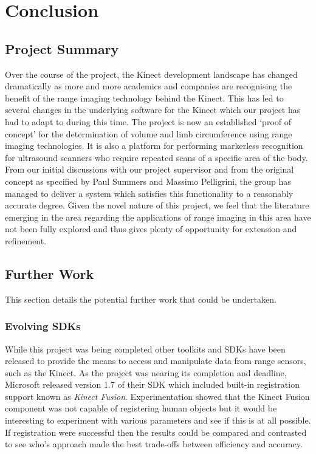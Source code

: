 \chapter{Conclusion}
\section{Project Summary}

Over the course of the project, the Kinect development landscape has changed dramatically as more and more academics and companies are recognising the benefit of the range imaging technology behind the Kinect. This has led to several changes in the underlying software for the Kinect which our project has had to adapt to during this time. The project is now an established `proof of concept' for the determination of volume and limb circumference using range imaging technologies. It is also a platform for performing markerless recognition for ultrasound scanners who require repeated scans of a specific area of the body. From our initial discussions with our project supervisor and from the original concept as specified by Paul Summers and Massimo Pelligrini, the group has managed to deliver a system which satisfies this functionality to a reasonably accurate degree. Given the novel nature of this project, we feel that the literature emerging in the area regarding the applications of range imaging in this area have not been fully explored and thus gives plenty of opportunity for extension and refinement. \\

\section{Further Work}
This section details the potential further work that could be undertaken.\\

\subsection{Evolving SDKs}
While this project was being completed other toolkits and SDKs have been released to provide the means to access and manipulate data from range sensors, such as the Kinect. As the project was nearing its completion and deadline, Microsoft released version 1.7 of their SDK which included built-in registration support known as \emph{Kinect Fusion}. Experimentation showed that the Kinect Fusion component was not capable of registering human objects but it would be interesting to experiment with various parameters and see if this is at all possible. If registration were successful then the results could be compared and contrasted to see who's approach made the best trade-offs between efficiency and accuracy.   


